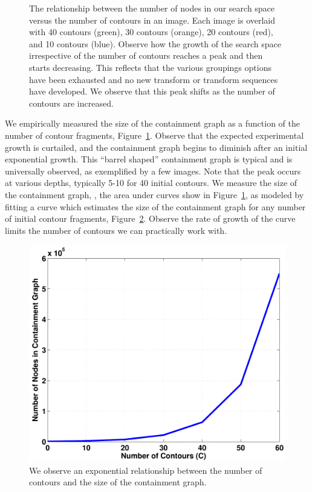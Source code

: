 \begin{figure}[ht]
\begin{tabular}{|cc|cc|}
\hline
\end{tabular}
\caption{The relationship between the number of nodes in our search space versus the number of contours in an image.  Each image is overlaid with 40 contours (green), 30 contours (orange), 20 contours (red), and 10 contours (blue). Observe how the growth of the search space irrespective of the number of contours reaches a peak and then starts decreasing. This reflects that the various groupings options have been exhausted and no new transform or transform sequences have developed. We observe that this peak shifts as the number of contours are increased.}
\label{fig:cgraph_growth}
\end{figure}

We empirically measured the size of the containment graph as a function of the number of contour fragments, Figure~\ref{fig:cgraph_growth}. Observe that the expected experimental growth is curtailed, and the containment graph begins to diminish after an initial exponential growth. This ``barrel shaped'' containment graph is typical and is universally observed, as exemplified by a few images. Note that the peak occurs at various depths, typically 5-10 for 40 initial contours. We measure the size of the containment graph, \ie, the area under curves show in Figure~\ref{fig:cgraph_growth}, as modeled by fitting a curve which estimates the size of the containment graph for any number of initial contour fragments, Figure~\ref{fig:gg_growth}. Observe the rate of growth of the curve limits the number of contours we can practically work with. 



\begin{figure}[!ht]
\centering
\includegraphics[width=0.32\linewidth]{figs/cgraph_growth.pdf}
\caption{We observe an exponential relationship between the number of contours and the size of the containment graph. }
\label{fig:gg_growth}
\end{figure}


